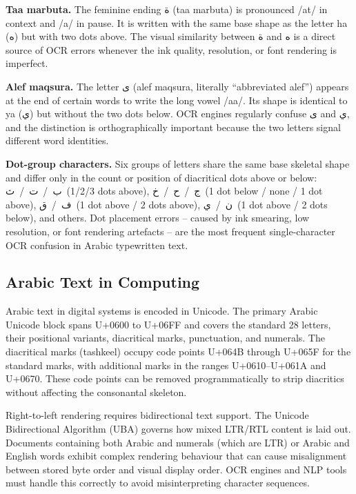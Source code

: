 \textbf{Taa marbuta.}
The feminine ending \textarabic{ة} (taa marbuta) is pronounced /at/ in context
and /a/ in pause.
It is written with the same base shape as the letter ha (\textarabic{ه}) but
with two dots above.
The visual similarity between \textarabic{ة} and \textarabic{ه} is a direct
source of OCR errors whenever the ink quality, resolution, or font rendering
is imperfect.

\textbf{Alef maqsura.}
The letter \textarabic{ى} (alef maqsura, literally ``abbreviated alef'') appears
at the end of certain words to write the long vowel /aa/.
Its shape is identical to ya (\textarabic{ي}) but without the two dots below.
OCR engines regularly confuse \textarabic{ى} and \textarabic{ي}, and the
distinction is orthographically important because the two letters signal
different word identities.

\textbf{Dot-group characters.}
Six groups of letters share the same base skeletal shape and differ only in
the count or position of diacritical dots above or below:
\textarabic{ب}~/~\textarabic{ت}~/~\textarabic{ث}~(1/2/3 dots above),
\textarabic{ج}~/~\textarabic{ح}~/~\textarabic{خ}~(1 dot below / none / 1 dot above),
\textarabic{ف}~/~\textarabic{ق}~(1 dot above / 2 dots above),
\textarabic{ن}~/~\textarabic{ي}~(1 dot above / 2 dots below), and others.
Dot placement errors -- caused by ink smearing, low resolution, or font
rendering artefacts -- are the most frequent single-character OCR confusion
in Arabic typewritten text.

\subsection{Arabic Text in Computing}
\label{subsec:arabic_computing}

Arabic text in digital systems is encoded in Unicode.
The primary Arabic Unicode block spans U+0600 to U+06FF and covers the standard
28 letters, their positional variants, diacritical marks, punctuation, and
numerals.
The diacritical marks (tashkeel) occupy code points U+064B through U+065F for
the standard marks, with additional marks in the ranges U+0610--U+061A and
U+0670.
These code points can be removed programmatically to strip diacritics without
affecting the consonantal skeleton.

Right-to-left rendering requires bidirectional text support.
The Unicode Bidirectional Algorithm (UBA) governs how mixed LTR/RTL content is
laid out.
Documents containing both Arabic and numerals (which are LTR) or Arabic and
English words exhibit complex rendering behaviour that can cause misalignment
between stored byte order and visual display order.
OCR engines and NLP tools must handle this correctly to avoid misinterpreting
character sequences.

